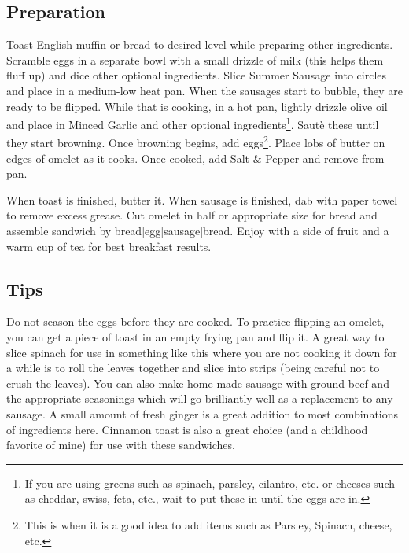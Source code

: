 \subsection*{Preparation}
Toast English muffin or bread to desired level while preparing other ingredients. Scramble eggs in a separate bowl with a small drizzle of milk (this helps them fluff up) and dice other optional ingredients. Slice Summer Sausage into circles and place in a medium-low heat pan. When the sausages start to bubble, they are ready to be flipped. While that is cooking, in a hot pan, lightly drizzle olive oil and place in Minced Garlic and other optional ingredients\footnote{If you are using greens such as spinach, parsley, cilantro, etc. or cheeses such as cheddar, swiss, feta, etc., wait to put these in until the eggs are in.}. Saut\`{e} these until they start browning. Once browning begins, add eggs\footnote{This is when it is a good idea to add items such as Parsley, Spinach, cheese, etc.}. Place lobs of butter on edges of omelet as it cooks. Once cooked, add Salt \& Pepper and remove from pan. 

When toast is finished, butter it. When sausage is finished, dab with paper towel to remove excess grease. Cut omelet in half or appropriate size for bread and assemble sandwich by bread|egg|sausage|bread. Enjoy with a side of fruit and a warm cup of tea for best breakfast results.


\subsection*{Tips}

Do not season the eggs before they are cooked. To practice flipping an omelet, you can get a piece of toast in an empty frying pan and flip it. A great way to slice spinach for use in something like this where you are not cooking it down for a while is to roll the leaves together and slice into strips (being careful not to crush the leaves). You can also make home made sausage with ground beef and the appropriate seasonings which will go brilliantly well as a replacement to any sausage. A small amount of fresh ginger is a great addition to most combinations of ingredients here. Cinnamon toast is also a great choice (and a childhood favorite of mine) for use with these sandwiches.